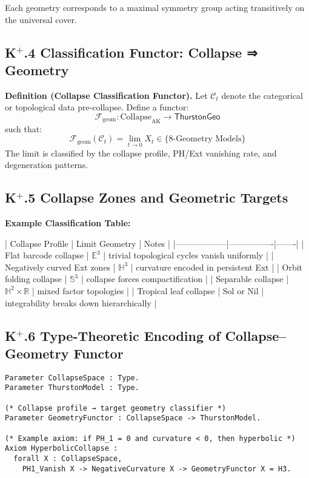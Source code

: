 \documentclass[11pt]{article}
\begin{document}
\begin{axiom}
\begin{axiom}
Each geometry corresponds to a maximal symmetry group acting transitively on the universal cover.

\subsection*{K$^+$.4 Classification Functor: Collapse ⇒ Geometry}

\textbf{Definition (Collapse Classification Functor).}  
Let \( \mathcal{C}_t \) denote the categorical or topological data pre-collapse.  
Define a functor:
\[
\mathcal{F}_{\mathrm{geom}} : \mathrm{Collapse}_{\mathrm{AK}} \to \mathsf{ThurstonGeo}
\]
such that:
\[
\mathcal{F}_{\mathrm{geom}}(\mathcal{C}_t) = \lim_{t \to 0} X_t \in \{ \text{8-Geometry Models} \}
\]
The limit is classified by the collapse profile, PH/Ext vanishing rate, and degeneration patterns.

\subsection*{K$^+$.5 Collapse Zones and Geometric Targets}

\textbf{Example Classification Table:}

| Collapse Profile | Limit Geometry | Notes |
|------------------|----------------|-------|
| Flat barcode collapse | \( \mathbb{E}^3 \) | trivial topological cycles vanish uniformly |
| Negatively curved Ext zones | \( \mathbb{H}^3 \) | curvature encoded in persistent Ext |
| Orbit folding collapse | \( \mathbb{S}^3 \) | collapse forces compactification |
| Separable collapse | \( \mathbb{H}^2 \times \mathbb{R} \) | mixed factor topologies |
| Tropical leaf collapse | Sol or Nil | integrability breaks down hierarchically |

\subsection*{K$^+$.6 Type-Theoretic Encoding of Collapse–Geometry Functor}

\begin{lstlisting}[language=Coq]
Parameter CollapseSpace : Type.
Parameter ThurstonModel : Type.

(* Collapse profile → target geometry classifier *)
Parameter GeometryFunctor : CollapseSpace -> ThurstonModel.

(* Example axiom: if PH_1 = 0 and curvature < 0, then hyperbolic *)
Axiom HyperbolicCollapse :
  forall X : CollapseSpace,
    PH1_Vanish X -> NegativeCurvature X -> GeometryFunctor X = H3.
\end{lstlisting}


\end{axiom}
\end{axiom}
\end{document}

